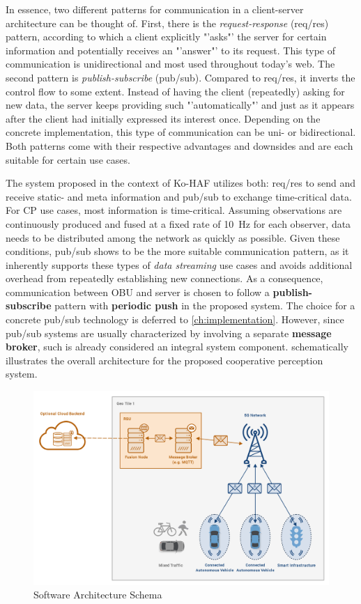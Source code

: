 In essence, two different patterns for communication in a client-server architecture can be thought of. First, there is the \textit{request-response} (req/res) pattern, according to which a client explicitly "'asks"' the server for certain information and potentially receives an "'answer"' to its request. This type of communication is unidirectional and most used throughout today's web. The second pattern is \textit{publish-subscribe} (pub/sub). Compared to req/res, it inverts the control flow to some extent. Instead of having the client (repeatedly) asking for new data, the server keeps providing such "'automatically"' and just as it appears after the client had initially expressed its interest once. Depending on the concrete implementation, this type of communication can be uni- or bidirectional. Both patterns come with their respective advantages and downsides and are each suitable for certain use cases.

The system proposed in the context of Ko-HAF \cite{Hohm2019} utilizes both: req/res to send and receive static- and meta information and pub/sub to exchange time-critical data. For CP use cases, most information is time-critical. Assuming observations are continuously produced and fused at a fixed rate of \SI{10}{\hertz} for each observer, data needs to be distributed among the network as quickly as possible. Given these conditions, pub/sub shows to be the more suitable communication pattern, as it inherently supports these types of \textit{data streaming} use cases and avoids additional overhead from repeatedly establishing new connections. As a consequence, communication between OBU and server is chosen to follow a \textbf{publish-subscribe} pattern with \textbf{periodic push} in the proposed system. The choice for a concrete pub/sub technology is deferred to \cref{ch:implementation}. However, since pub/sub systems are usually characterized by involving a separate \textbf{message broker}, such is already considered an integral system component.  schematically illustrates the overall architecture for the proposed cooperative perception system.

\begin{figure}
	\centering
	\includegraphics[width=1\linewidth]{98_images/architecture}
	\caption{Software Architecture Schema}
	\label{fig:architecture}
\end{figure}

